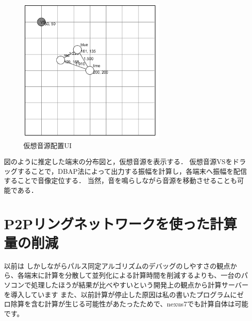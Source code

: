 \begin{figure}[p]\centering
  \hspace{-2mm}\includegraphics[clip,width=1.1\hsize]{img/relpos.png}
  \caption{仮想音源配置UI}\label{fig:relpos}
\end{figure}

図のように推定した端末の分布図と，仮想音源を表示する．
仮想音源VSをドラッグすることで，DBAP法によって出力する振幅を計算し，各端末へ振幅を配信することで音像定位する．
当然，音を鳴らしながら音源を移動させることも可能である．


\section{P2Pリングネットワークを使った計算量の削減}
以前は
しかしながらパルス同定アルゴリズムのデバッグのしやすさの観点から、各端末に計算を分散して並列化による計算時間を削減するよりも、一台のパソコンで処理したほうが結果が比べやすいという開発上の観点から計算サーバーを導入しています
また、以前計算が停止した原因は私の書いたプログラムにゼロ除算を含む計算が生じる可能性があたったためで、nexus7でも計算自体は可能です。
